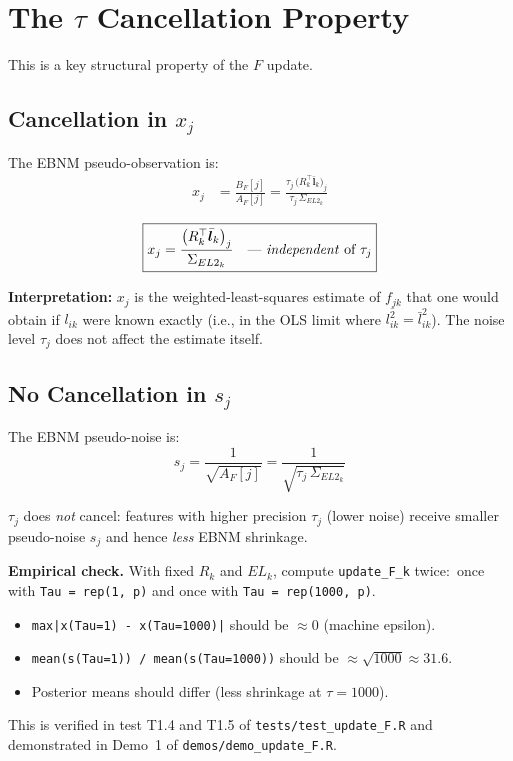 \documentclass[11pt]{article}
\newcommand{\lbar}[2]{\bar{l}_{#1#2}}
\newcommand{\lsec}[2]{\overline{l^2_{#1#2}}}
\begin{document}
\section{The $\tau$ Cancellation Property}\label{sec:cancellation}

This is a key structural property of the $F$ update.

\subsection{Cancellation in $x_j$}

The EBNM pseudo-observation is:
\begin{align}
  x_j &= \frac{B_F[j]}{A_F[j]}
       = \frac{\tau_j\,\bigl(R_k^\top\bar{\bm{l}}_k\bigr)_j}
              {\tau_j\,\Sigma_{EL2_k}}
  \label{eq:xj-cancel}
\end{align}

\begin{equation}
  \boxed{x_j = \frac{\bigl(R_k^\top\bar{\bm{l}}_k\bigr)_j}{\Sigma_{EL2_k}}
  \quad\text{--- \emph{independent} of }\tau_j}
  \label{eq:xj-final}
\end{equation}

\textbf{Interpretation:} $x_j$ is the weighted-least-squares estimate
of $f_{jk}$ that one would obtain if $l_{ik}$ were known exactly (i.e.,
in the OLS limit where $\lsec{i}{k} = \lbar{i}{k}^2$).  The noise level
$\tau_j$ does not affect the estimate itself.

\subsection{No Cancellation in $s_j$}

The EBNM pseudo-noise is:
\begin{equation}
  s_j = \frac{1}{\sqrt{A_F[j]}} = \frac{1}{\sqrt{\tau_j\,\Sigma_{EL2_k}}}
  \label{eq:sj}
\end{equation}

$\tau_j$ does \emph{not} cancel: features with higher precision $\tau_j$
(lower noise) receive smaller pseudo-noise $s_j$ and hence \emph{less}
EBNM shrinkage.

\begin{verifybox}
\textbf{Empirical check.}  With fixed $R_k$ and $EL_k$, compute
\texttt{update\_F\_k} twice:\ once with \texttt{Tau = rep(1, p)} and once
with \texttt{Tau = rep(1000, p)}.

\begin{itemize}
  \item \texttt{max|x(Tau=1) - x(Tau=1000)|} should be $\approx 0$ (machine epsilon).
  \item \texttt{mean(s(Tau=1)) / mean(s(Tau=1000))} should be $\approx \sqrt{1000} \approx 31.6$.
  \item Posterior means should differ (less shrinkage at $\tau=1000$).
\end{itemize}
This is verified in test T1.4 and T1.5 of \texttt{tests/test\_update\_F.R}
and demonstrated in Demo~1 of \texttt{demos/demo\_update\_F.R}.
\end{verifybox}
\end{document}

